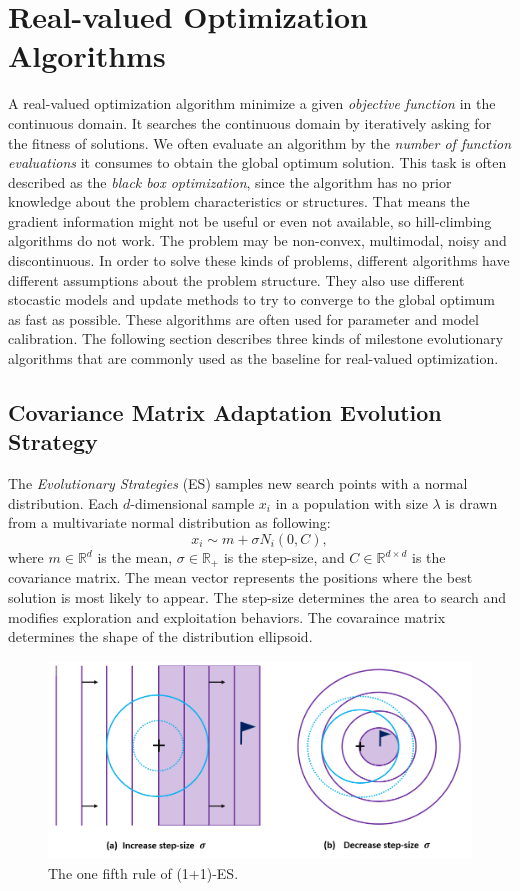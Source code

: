 \chapter{Real-valued Optimization Algorithms}
\label{chapter:algos}

A real-valued optimization algorithm minimize a given \textit{objective function} in the continuous domain.
It searches the continuous domain by iteratively asking for the fitness of solutions.
We often evaluate an algorithm by the \textit{number of function evaluations} it consumes to obtain the global optimum solution.
This task is often described as the \textit{black box optimization},
since the algorithm has no prior knowledge about the problem characteristics or structures.
That means the gradient information might not be useful or even not available, so hill-climbing algorithms do not work.
The problem may be non-convex, multimodal, noisy and discontinuous.
In order to solve these kinds of problems, different algorithms have different assumptions about the problem structure.
They also use different stocastic models and update methods to try to converge to the global optimum as fast as possible.
These algorithms are often used for parameter and model calibration.  
The following section describes three kinds of milestone evolutionary algorithms 
that are commonly used as the baseline for real-valued optimization.


\section{Covariance Matrix Adaptation Evolution Strategy}
The \textit{Evolutionary Strategies} (ES) samples new search points with a normal distribution.
Each $d$-dimensional sample $x_i$ in a population with size $\lambda$ is drawn from a multivariate normal distribution as following:  
\begin{displaymath}
x_i \sim m + \sigma N_i(0,C),
\end{displaymath}
where $m \in \mathbb{R}^d$ is the mean, $\sigma \in \mathbb{R}_+$ is the step-size, and $C \in \mathbb{R}^{d \times d}$ is the covariance matrix.
The mean vector represents the positions where the best solution is most likely to appear.
The step-size determines the area to search and modifies exploration and exploitation behaviors.
The covaraince matrix determines the shape of the distribution ellipsoid.

\begin{figure}
\centering
\includegraphics[width=\textwidth]{one_plus_one_ES}
\caption{The one fifth rule of (1+1)-ES.}\label{fig:one_plus_one_ES}
\end{figure}


